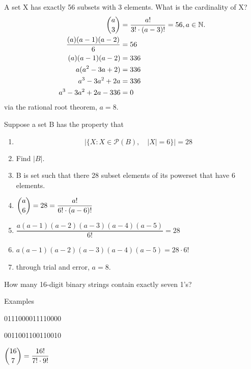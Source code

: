 \documentclass[openany, 12pt]{book}
\begin{document}
\begin{exercise}{}{}
	A set X has exactly 56 subsets with 3 elements. What is the cardinality of X?
	\begin{align*}
		\dbinom{a}{3}            & = \dfrac{a!}{3! \cdot(a-3)!}=56, a \in \mathbb{N}. \\
		\dfrac{(a)(a-1)(a-2)}{6} & =56                                                \\
		(a)(a-1)(a-2)            & =336                                               \\
		a(a^2-3a+2)              & =336                                               \\
		a^3-3a^2+2a              & =336                                               \\
		a^3-3a^2+2a-336          & =0
	\end{align*}
	via the rational root theorem, $a=8$.
\end{exercise}

\begin{exercise}{}{}
	Suppose a set B has the property that
	\begin{enumerate}[label={\textbullet}, leftmargin=*, itemsep=0pt, parsep=0pt]
		\item $$|\{X: X \in \mathcal{P}(B),\quad|X|=6\}|=28$$
		\item Find $|B|$.
		\item B is set such that there 28 subset elements of its powerset that have
		      6 elements.
		\item $\dbinom{a}{6}=28 = \dfrac{a!}{6!\cdot(a-6)!}$
		\item $\dfrac{a(a-1)(a-2)(a-3)(a-4)(a-5)}{6!}=28$
		\item $a(a-1)(a-2)(a-3)(a-4)(a-5)=28\cdot6!$
		\item through trial and error, $a=8$.
	\end{enumerate}
\end{exercise}

\begin{exercise}{}{}
	How many 16-digit binary strings contain exactly seven 1's?
	\begin{alist}
		\item Examples
		\item 0111000011110000
		\item 0011001100110010
		\item $\dbinom{16}{7}= \dfrac{16!}{7!\cdot9!}$
	\end{alist}
\end{exercise}
\end{document}
